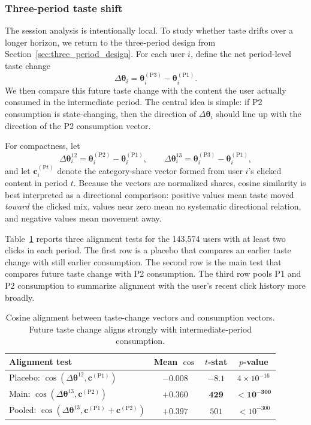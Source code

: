 \documentclass[11pt]{article}
\begin{document}
\subsubsection{Three-period taste shift}
\label{sec:three_period}

The session analysis is intentionally local. To study whether taste drifts over a longer horizon, we return to the three-period design from Section~\ref{sec:three_period_design}. For each user $i$, define the net period-level taste change
\[
\Delta\boldsymbol{\theta}_i
=
\boldsymbol{\theta}_i^{(\mathrm{P3})}
-
\boldsymbol{\theta}_i^{(\mathrm{P1})}.
\]
We then compare this future taste change with the content the user actually consumed in the intermediate period. The central idea is simple: if P2 consumption is state-changing, then the direction of $\Delta\boldsymbol{\theta}_i$ should line up with the direction of the P2 consumption vector.

For compactness, let
\[
\Delta\boldsymbol{\theta}_i^{12}
=
\boldsymbol{\theta}_i^{(\mathrm{P2})}
-
\boldsymbol{\theta}_i^{(\mathrm{P1})},
\qquad
\Delta\boldsymbol{\theta}_i^{13}
=
\boldsymbol{\theta}_i^{(\mathrm{P3})}
-
\boldsymbol{\theta}_i^{(\mathrm{P1})},
\]
and let $\mathbf{c}_i^{(\mathrm{P}t)}$ denote the category-share vector formed from user $i$'s clicked content in period $t$. Because the vectors are normalized shares, cosine similarity is best interpreted as a directional comparison: positive values mean taste moved \emph{toward} the clicked mix, values near zero mean no systematic directional relation, and negative values mean movement away.

Table~\ref{tab:taste_alignment} reports three alignment tests for the 143,574 users with at least two clicks in each period. The first row is a placebo that compares an earlier taste change with still earlier consumption. The second row is the main test that compares future taste change with P2 consumption. The third row pools P1 and P2 consumption to summarize alignment with the user's recent click history more broadly.

\begin{table}[ht]
\centering
\caption{Cosine alignment between taste-change vectors and consumption vectors. Future taste change aligns strongly with intermediate-period consumption.}
\label{tab:taste_alignment}
\begin{tabular}{lccc}
\toprule
Alignment test & Mean $\cos$ & $t$-stat & $p$-value \\
\midrule
Placebo: $\cos(\Delta\boldsymbol{\theta}^{12}, \mathbf{c}^{(\mathrm{P1})})$ & $-0.008$ & $-8.1$ & $4 \times 10^{-16}$ \\
Main: $\cos(\Delta\boldsymbol{\theta}^{13}, \mathbf{c}^{(\mathrm{P2})})$ & $\boldsymbol{+0.360}$ & $\boldsymbol{429}$ & $\boldsymbol{< 10^{-300}}$ \\
Pooled: $\cos(\Delta\boldsymbol{\theta}^{13}, \mathbf{c}^{(\mathrm{P1})}{+}\mathbf{c}^{(\mathrm{P2})})$ & $+0.397$ & $501$ & $< 10^{-300}$ \\
\bottomrule
\end{tabular}
\end{table}
\FloatBarrier
\end{document}

